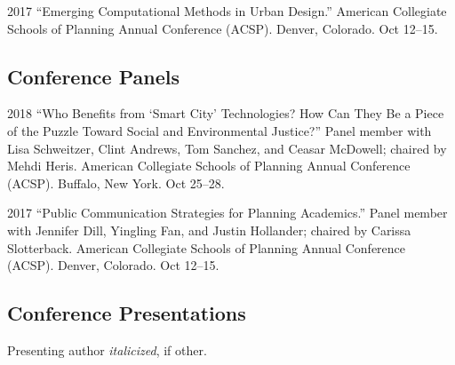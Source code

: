 \documentclass{academiccv}
\begin{document}
\begin{tablist}
	
\item[2017] \tab \enquote{Emerging Computational Methods in Urban Design.} American Collegiate Schools of Planning Annual Conference (ACSP). Denver, Colorado. Oct 12--15.
	
\end{tablist}

\subsection*{Conference Panels}

\begin{tablist}
	
\item[2018] \tab \enquote{Who Benefits from \enquote{Smart City} Technologies? How Can They Be a Piece of the Puzzle Toward Social and Environmental Justice?} Panel member with Lisa Schweitzer, Clint Andrews, Tom Sanchez, and Ceasar McDowell; chaired by Mehdi Heris. American Collegiate Schools of Planning Annual Conference (ACSP). Buffalo, New York. Oct 25--28.

\item[2017] \tab \enquote{Public Communication Strategies for Planning Academics.} Panel member with Jennifer Dill, Yingling Fan, and Justin Hollander; chaired by Carissa Slotterback. American Collegiate Schools of Planning Annual Conference (ACSP). Denver, Colorado. Oct 12--15.

\end{tablist}

\subsection*{Conference Presentations}

Presenting author \textit{italicized}, if other.\bigskip
\end{document}
